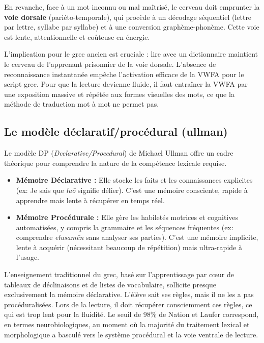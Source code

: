 {En revanche, face à un mot inconnu ou mal maîtrisé, le cerveau doit emprunter la \textbf{voie
dorsale} (pariéto-temporale), qui procède à un décodage séquentiel (lettre par lettre, syllabe par
syllabe) et à une conversion graphème-phonème. Cette voie est lente, attentionnelle et coûteuse en
énergie.\cite{II-3-2-ref34}

L'implication pour le grec ancien est cruciale : \og lire avec un dictionnaire\fg{} maintient le
cerveau de l'apprenant prisonnier de la voie dorsale. L'absence de reconnaissance instantanée
empêche l'activation efficace de la VWFA pour le script grec. Pour que la lecture devienne fluide,
il faut entraîner la VWFA par une exposition massive et répétée aux formes visuelles des mots, ce
que la méthode de traduction mot à mot ne permet pas.\cite{II-3-2-ref36}



\subsection{Le modèle déclaratif/procédural (ullman)}

Le modèle DP (\textit{Declarative/Procedural}) de Michael Ullman offre un cadre théorique pour
comprendre la nature de la compétence lexicale requise.

\begin{itemize}\item \textbf{Mémoire Déclarative :} Elle stocke les faits et les connaissances explicites (ex: \og Je sais que \textit{luō} signifie délier\fg{}). C'est une mémoire consciente, rapide à apprendre mais lente à récupérer en temps réel.\item \textbf{Mémoire Procédurale :} Elle gère les habiletés motrices et cognitives automatisées, y compris la grammaire et les séquences fréquentes (ex: comprendre \textit{elusamēn} sans analyser ses parties). C'est une mémoire implicite, lente à acquérir (nécessitant beaucoup de répétition) mais ultra-rapide à l'usage.\cite{II-3-2-ref38}\end{itemize}L'enseignement traditionnel du grec, basé sur l'apprentissage par cœur de tableaux de déclinaisons
et de listes de vocabulaire, sollicite presque exclusivement la mémoire déclarative. L'élève \og
sait\fg{} ses règles, mais il ne les a pas \og procéduralisées\fg{}. Lors de la lecture, il doit
récupérer consciemment ces règles, ce qui est trop lent pour la fluidité. Le seuil de 98\% de Nation
et Laufer correspond, en termes neurobiologiques, au moment où la majorité du traitement lexical et
morphologique a basculé vers le système procédural et la voie ventrale de
lecture.\cite{II-3-2-ref40}



}
